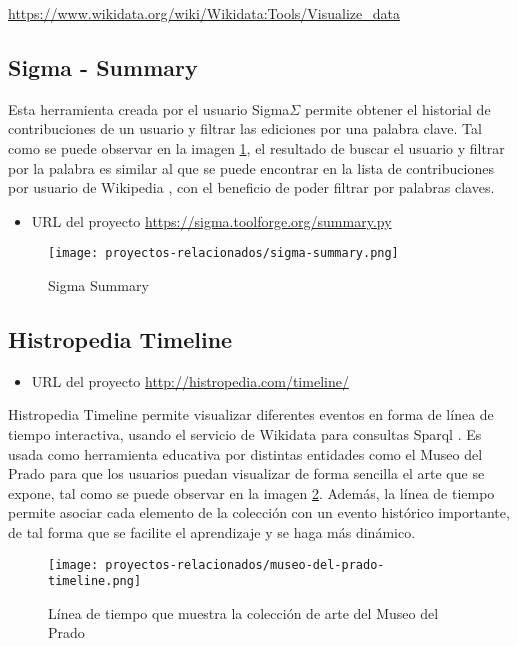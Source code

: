 \url{https://www.wikidata.org/wiki/Wikidata:Tools/Visualize_data}

\subsection{Sigma - Summary}

Esta herramienta creada por el usuario Sigma\(\Sigma\) permite obtener el historial de contribuciones de un usuario y filtrar las ediciones por una palabra clave. Tal como se puede observar en la imagen \ref{fig:sigma_summary}, el resultado de buscar el usuario  y filtrar por la palabra  es similar al que se puede encontrar en la lista de contribuciones por usuario de Wikipedia \cite{UserClarityfiend}, con el beneficio de poder filtrar por palabras claves.

\begin{itemize}
    \item URL del proyecto \url{https://sigma.toolforge.org/summary.py}
\end{itemize}

\begin{figure}[H]
    \centering
    \texttt{[image: proyectos-relacionados/sigma-summary.png]}
    \caption{Sigma Summary}
    \label{fig:sigma_summary}
\end{figure}

\subsection{Histropedia Timeline}

\begin{itemize}
    \item URL del proyecto \url{http://histropedia.com/timeline/}
\end{itemize}

Histropedia Timeline permite visualizar diferentes eventos en forma de línea de tiempo interactiva, usando el servicio de Wikidata para consultas Sparql \cite{WikidataSparql}. Es usada como herramienta educativa por distintas entidades como el Museo del Prado para que los usuarios puedan visualizar de forma sencilla el arte que se expone, tal como se puede observar en la imagen \ref{fig:museo-de-prado-timeline}. Además, la línea de tiempo permite asociar cada elemento de la colección con un evento histórico importante, de tal forma que se facilite el aprendizaje y se haga más dinámico.

\begin{figure}[H]
    \centering
    \texttt{[image: proyectos-relacionados/museo-del-prado-timeline.png]}
    \caption{Línea de tiempo que muestra la colección de arte del Museo del Prado}
    \label{fig:museo-de-prado-timeline}
\end{figure}



